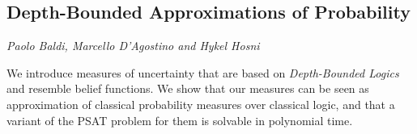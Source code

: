 \documentclass[../booklet.tex]{subfiles}
\begin{document}
\subsection[Depth-Bounded Approximations of Probability. {\it Paolo Baldi, Marcello D'Agostino and Hykel Hosni}]{Depth-Bounded Approximations of Probability}
  

\begin{center}
  {\it Paolo Baldi, Marcello D'Agostino and Hykel Hosni}
\end{center}

\vskip 0.8cm


We introduce measures of uncertainty that are based on {\em Depth-Bounded Logics} \cite{DFG13} and resemble belief functions. We show that our measures can be seen as approximation of classical probability measures over classical logic, and that 
a variant of the PSAT \cite{hansen2000} problem for them is solvable in polynomial time. 
\end{document}
